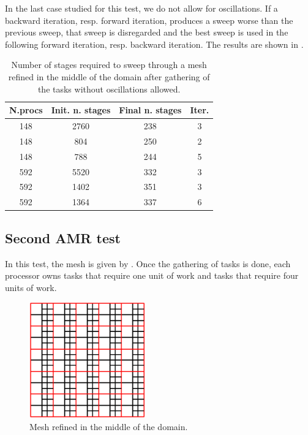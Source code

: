 \documentclass[letterpaper]{article}
\renewcommand{\(}{\left(}
\renewcommand{\)}{\right)}
\renewcommand{\[}{\left[}
\renewcommand{\]}{\right]}
\begin{document}
In the last case studied for this test, we do not allow for oscillations. If a
backward iteration, resp. forward iteration, produces a sweep worse than the
previous sweep, that sweep is disregarded and the best sweep is used in the
following forward iteration, resp. backward iteration. The results are shown in 
.
\begin{table}[H]
  \begin{center}
    \begin{tabular}{|c|c|c|c|}
      \hline
      N.procs & Init. n. stages & Final n. stages & Iter. \\
      \hline
      148 & 2760 & 238 & 3 \\
      148 & 804  & 250 & 2 \\
      148 & 788  & 244 & 5 \\
      592 & 5520 & 332 & 3 \\
      592 & 1402 & 351 & 3 \\
      592 & 1364 & 337 & 6 \\
      \hline
    \end{tabular}
    \caption{Number of stages required to sweep through a mesh refined in the
      middle of the domain after gathering of the tasks without oscillations
    allowed.}
    \label{amr_3}
  \end{center}
\end{table}


\subsection{Second AMR test}
In this test, the mesh is given by . Once the gathering of tasks is
done, each processor owns tasks that require one unit of work and tasks that
require four units of work.
\begin{figure}[H]
  \centering
  \includegraphics[width=5cm]{mesh_2}
  \caption{Mesh refined in the middle of the domain.}
  \label{mesh_2}
\end{figure}
\end{document}
